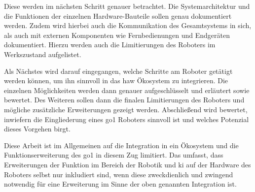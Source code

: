 Diese werden im nächsten Schritt genauer betrachtet.
Die Systemarchitektur und die Funktionen der einzelnen Hardware-Bauteile sollen genau dokumentiert werden.
Zudem wird hierbei auch die Kommunikation des Gesamtsystems in sich, als auch mit externen Komponenten wie Fernbedienungen
und Endgeräten dokumentiert.
Hierzu werden auch die Limitierungen des Roboters im Werkszustand aufgelistet.

Als Nächstes wird darauf eingegangen, welche Schritte am Roboter getätigt werden können, um ihn sinnvoll
in das \gls{haw} Ökosystem zu integrieren.
Die einzelnen Möglichkeiten werden dann genauer aufgeschlüsselt und erläutert sowie bewertet.
Des Weiteren sollen dann die finalen Limitierungen des Roboters und mögliche zusätzliche Erweiterungen gezeigt werden.
Abschließend wird bewertet, inwiefern die Eingliederung eines \gls{go1} Roboters sinnvoll ist und welches Potenzial dieses Vorgehen birgt.

Diese Arbeit ist im Allgemeinen auf die Integration in ein Ökosystem und die Funktionserweiterung des \gls{go1} in diesem Zug limitiert.
Das umfasst, dass Erweiterungen der Funktion im Bereich der Robotik und \gls{ki} auf der Hardware des Roboters selbst nur inkludiert sind, wenn
diese zweckdienlich und zwingend notwendig für eine Erweiterung im Sinne der oben genannten Integration ist.

